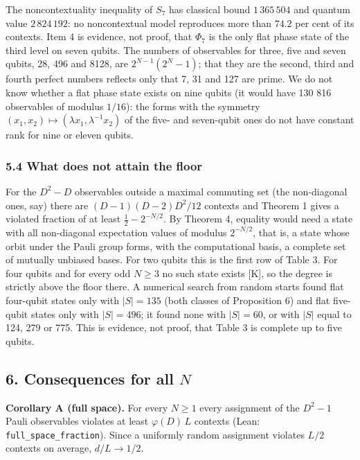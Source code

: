 \documentclass[11pt,a4paper]{article}
\begin{document}
The noncontextuality inequality of \(S_7\) has classical bound \(1\,365\,504\) and quantum value \(2\,824\,192\):
no noncontextual model reproduces more than \(74.2\) per cent of its contexts. Item 4 is evidence, not
proof, that \(\Phi_7\) is the only flat phase state of the third level on seven qubits. The numbers of
observables for three, five and seven qubits, 28, 496 and 8128, are \(2^{N-1}(2^N-1)\); that they are the
second, third and fourth perfect numbers reflects only that 7, 31 and 127 are prime. We do not know
whether a flat phase state exists on nine qubits (it would have 130 816 observables of modulus \(1/16\)):
the forms with the symmetry \((x_1,x_2) \mapsto (\lambda x_1,\lambda^{-1}x_2)\) of the five- and seven-qubit
ones do not have constant rank for nine or eleven qubits.

\subsubsection{5.4 What does not attain the floor}\label{54-what-does-not-attain-the-floor}

For the \(D^2 - D\) observables outside a maximal commuting set (the
non-diagonal ones, say) there are \((D-1)(D-2)D^2/12\) contexts and Theorem 1 gives a violated fraction of
at least \(\tfrac12 - 2^{-N/2}\). By Theorem 4, equality would need a state with all non-diagonal
expectation values of modulus \(2^{-N/2}\), that is, a state whose orbit under the Pauli group forms,
with the computational basis, a complete set of mutually unbiased bases. For two qubits this is the
first row of Table 3. For four qubits and for every odd \(N \ge 3\) no such state exists {[}K{]}, so the
degree is strictly above the floor there. A numerical search from random starts found flat four-qubit
states only with \(|S| = 135\) (both classes of Proposition 6) and flat five-qubit states only with
\(|S| = 496\); it found none with \(|S| = 60\), or with \(|S|\) equal to 124, 279 or 775. This is evidence, not
proof, that Table 3 is complete up to five qubits.

\subsection{\texorpdfstring{6. Consequences for all \(N\)}{6. Consequences for all N}}\label{6-consequences-for-all-n}

\textbf{Corollary A (full space).} For every \(N \ge 1\) every assignment of the \(D^2 - 1\) Pauli observables
violates at least \(\varphi(D)\,L\) contexts (Lean: \texttt{full\_space\_fraction}). Since a uniformly random
assignment violates \(L/2\) contexts on average, \(d/L \to 1/2\).
\end{document}
